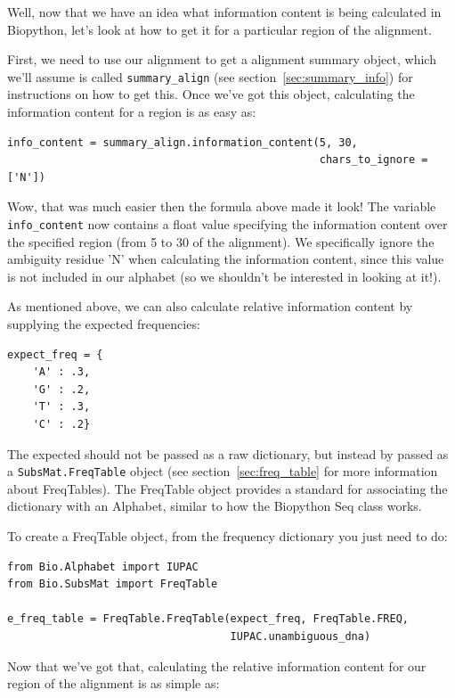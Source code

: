 \documentclass{report}
\begin{document}
Well, now that we have an idea what information content is being calculated in Biopython, let's look at how to get it for a particular region of the alignment.

First, we need to use our alignment to get a alignment summary object, which we'll assume is called \verb|summary_align| (see section~\ref{sec:summary_info}) for instructions on how to get this. Once we've got this object, calculating the information content for a region is as easy as:

\begin{verbatim}
info_content = summary_align.information_content(5, 30,
                                                 chars_to_ignore = ['N'])
\end{verbatim}

Wow, that was much easier then the formula above made it look! The variable \verb|info_content| now contains a float value specifying the information content over the specified region (from 5 to 30 of the alignment). We specifically ignore the ambiguity residue 'N' when calculating the information content, since this value is not included in our alphabet (so we shouldn't be interested in looking at it!).

As mentioned above, we can also calculate relative information content by supplying the expected frequencies:

\begin{verbatim}
expect_freq = {
    'A' : .3,
    'G' : .2,
    'T' : .3,
    'C' : .2}
\end{verbatim}

The expected should not be passed as a raw dictionary, but instead by passed as a \verb|SubsMat.FreqTable| object (see section~\ref{sec:freq_table} for more information about FreqTables). The FreqTable object provides a standard for associating the dictionary with an Alphabet, similar to how the Biopython Seq class works.

To create a FreqTable object, from the frequency dictionary you just need to do:

\begin{verbatim}
from Bio.Alphabet import IUPAC
from Bio.SubsMat import FreqTable

e_freq_table = FreqTable.FreqTable(expect_freq, FreqTable.FREQ,
                                   IUPAC.unambiguous_dna)
\end{verbatim}

Now that we've got that, calculating the relative information content for our region of the alignment is as simple as:
\end{document}
